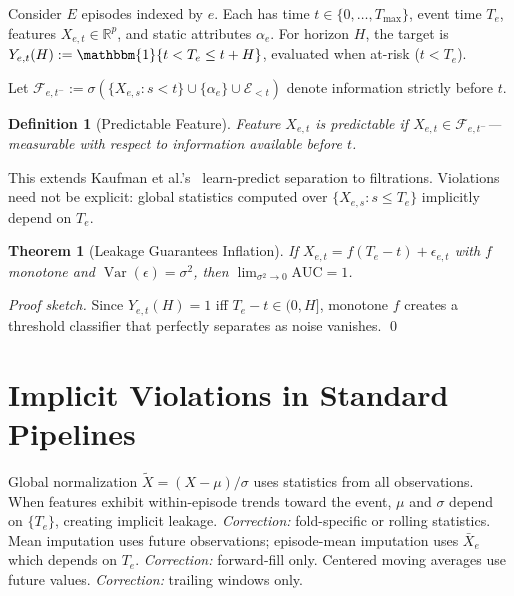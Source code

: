 \documentclass[acmsmall,nonacm]{acmart}
\newcommand{\1}{\mathbbm{1}}
\newcommand{\Var}{\operatorname{Var}}
\newtheorem{theorem}{Theorem}
\newtheorem{definition}{Definition}
\begin{document}
Consider $E$ episodes indexed by $e$. Each has time $t \in \{0,\ldots,T_{\max}\}$, event time $T_e$, features $X_{e,t} \in \mathbb{R}^p$, and static attributes $\alpha_e$. For horizon $H$, the target is $Y_{e,t}(H) := \1\{t < T_e \leq t + H\}$, evaluated when at-risk ($t < T_e$).

Let $\mathcal{F}_{e,t^-} := \sigma(\{X_{e,s} : s < t\} \cup \{\alpha_e\} \cup \mathcal{E}_{<t})$ denote information strictly before $t$.

\begin{definition}[Predictable Feature]
Feature $X_{e,t}$ is \emph{predictable} if $X_{e,t} \in \mathcal{F}_{e,t^-}$---measurable with respect to information available before $t$.
\end{definition}

This extends Kaufman et al.'s~\cite{kaufman2012} learn-predict separation to filtrations. Violations need not be explicit: global statistics computed over $\{X_{e,s} : s \leq T_e\}$ implicitly depend on $T_e$.

\begin{theorem}[Leakage Guarantees Inflation]\label{thm:leakage}
If $X_{e,t} = f(T_e - t) + \epsilon_{e,t}$ with $f$ monotone and $\Var(\epsilon) = \sigma^2$, then $\lim_{\sigma^2 \to 0} \text{AUC} = 1$.
\end{theorem}

\textit{Proof sketch.} Since $Y_{e,t}(H)=1$ iff $T_e - t \in (0,H]$, monotone $f$ creates a threshold classifier that perfectly separates as noise vanishes. \qed

\section{Implicit Violations in Standard Pipelines}\label{sec:implicit}

Global normalization $\tilde{X} = (X - \mu)/\sigma$ uses statistics from all observations. When features exhibit within-episode trends toward the event, $\mu$ and $\sigma$ depend on $\{T_e\}$, creating implicit leakage. \textit{Correction:} fold-specific or rolling statistics. Mean imputation uses future observations; episode-mean imputation uses $\bar{X}_e$ which depends on $T_e$. \textit{Correction:} forward-fill only.
Centered moving averages use future values. \textit{Correction:} trailing windows only.
\end{document}

